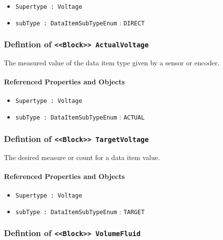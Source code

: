 \begin{itemize}
\item \texttt{Supertype : Voltage}

\item \texttt{subType : DataItemSubTypeEnum} : \texttt{DIRECT}

\end{itemize}
\FloatBarrier
\subsubsection{Defintion of \texttt{<<Block>> ActualVoltage}}
  \label{type:ActualVoltage}

\FloatBarrier

The measured value of the data item type given by a sensor or encoder.

\FloatBarrier
\paragraph{Referenced Properties and Objects}

\begin{itemize}
\item \texttt{Supertype : Voltage}

\item \texttt{subType : DataItemSubTypeEnum} : \texttt{ACTUAL}

\end{itemize}
\FloatBarrier
\subsubsection{Defintion of \texttt{<<Block>> TargetVoltage}}
  \label{type:TargetVoltage}

\FloatBarrier

The desired measure or count for a data item value.

\FloatBarrier
\paragraph{Referenced Properties and Objects}

\begin{itemize}
\item \texttt{Supertype : Voltage}

\item \texttt{subType : DataItemSubTypeEnum} : \texttt{TARGET}

\end{itemize}
\FloatBarrier
\subsubsection{Defintion of \texttt{<<Block>> VolumeFluid}}
  \label{type:VolumeFluid}

